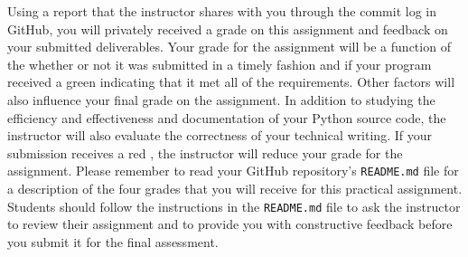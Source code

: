 \documentclass[11pt]{article}
\newcommand{\program}[1]{\lstinline{#1}}
\newcommand{\checkmark}{\ding{51}}
\newcommand{\naughtmark}{\ding{55}}
\begin{document}
Using a report that the instructor shares with you through the commit log in
GitHub, you will privately received a grade on this assignment and feedback on
your submitted deliverables. Your grade for the assignment will be a function of
the whether or not it was submitted in a timely fashion and if your program
received a green \checkmark{} indicating that it met all of the requirements.
Other factors will also influence your final grade on the assignment. In
addition to studying the efficiency and effectiveness and documentation of your
Python source code, the instructor will also evaluate the correctness of your
technical writing. If your submission receives a red \naughtmark{}, the
instructor will reduce your grade for the assignment. Please remember to read
your GitHub repository's \program{README.md} file for a description of the four
grades that you will receive for this practical assignment. Students should
follow the instructions in the \program{README.md} file to ask the instructor to
review their assignment and to provide you with constructive feedback before you
submit it for the final assessment.
\end{document}
